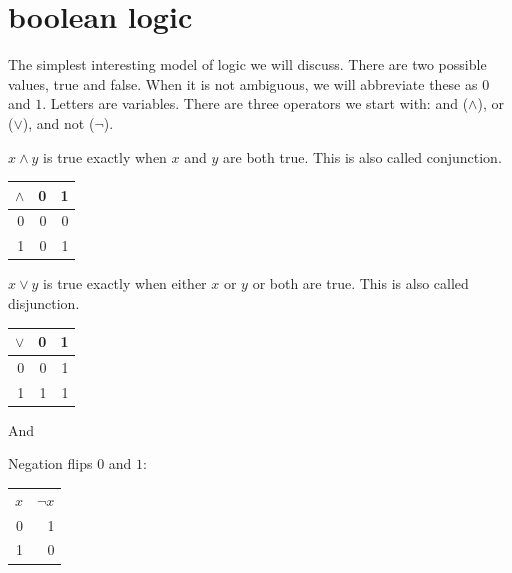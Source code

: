 \documentclass{scrbook}
\begin{document}
\chapter[Boolean Logic]{boolean logic}
The simplest interesting model of logic we will discuss. There are two possible values, true and false. When it is not ambiguous, we will abbreviate these as $0$ and $1$. Letters are variables. There are three operators we start with: and ($\wedge$), or ($\vee$), and not ($\neg$). 
\begin{defn}
  \label{def:bool:and}
  $x \wedge y$ is true exactly when $x$ and $y$ are both true. This is also called conjunction.
  \begin{center}
    \begin{tabular}{r|rr}
      $\wedge$ & 0 & 1 \\
      \hline
      0 & 0 & 0 \\
      1 & 0 & 1 
    \end{tabular}
  \end{center}
\end{defn}

\begin{defn}[or $\vee$]
  \label{def:bool:or}
  $x \vee y$ is true exactly when either $x$ or $y$ or both are true. This is also called disjunction.
  \begin{center}
\begin{tabular}{r|rr}
$\vee$ & 0 & 1 \\
  \hline
0 & 0 & 1 \\
1 & 1 & 1 
\end{tabular}
\end{center}
\end{defn}
And
\begin{defn}
Negation flips $0$ and $1$:
  \begin{center}
\begin{tabular}{rr}
$x$ & $\neg x$ \\
0 & 1 \\
1 & 0 
\end{tabular}
\end{center}
\end{defn}
\end{document}

